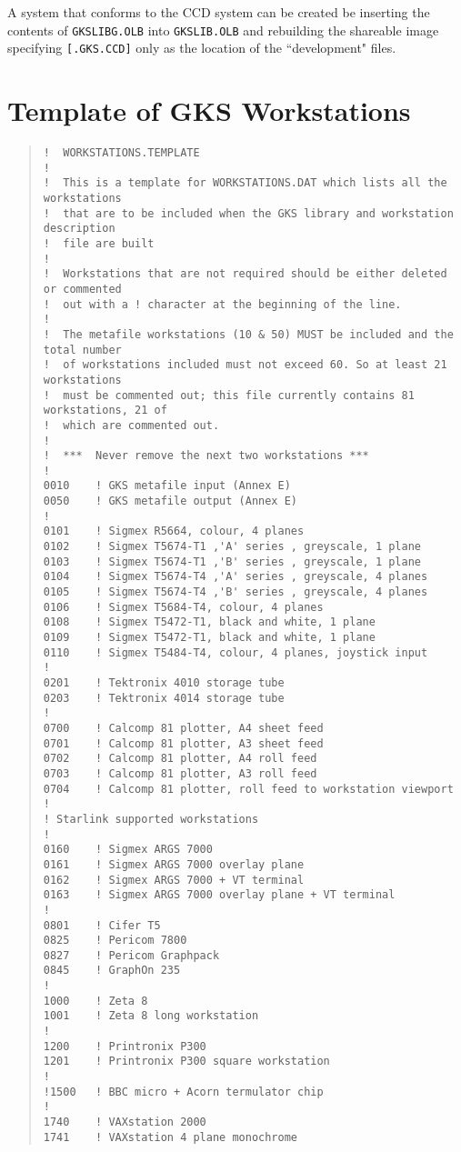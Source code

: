 A system that conforms to the CCD system can be created be inserting the
contents of {\tt GKSLIBG\-.OLB} into {\tt GKSLIB.OLB} and rebuilding the
shareable image specifying {\tt [.GKS.CCD]} only as the location of the
``development" files.

\newpage
\appendix
\section{Template of GKS Workstations}
\label{se:temp}
\begin{quote}\small
\begin{verbatim}
!  WORKSTATIONS.TEMPLATE
!
!  This is a template for WORKSTATIONS.DAT which lists all the workstations
!  that are to be included when the GKS library and workstation description
!  file are built
!
!  Workstations that are not required should be either deleted or commented
!  out with a ! character at the beginning of the line.
!
!  The metafile workstations (10 & 50) MUST be included and the total number
!  of workstations included must not exceed 60. So at least 21 workstations
!  must be commented out; this file currently contains 81 workstations, 21 of
!  which are commented out.
!
!  ***  Never remove the next two workstations ***
!
0010	! GKS metafile input (Annex E)
0050	! GKS metafile output (Annex E)
!
0101	! Sigmex R5664, colour, 4 planes
0102	! Sigmex T5674-T1 ,'A' series , greyscale, 1 plane
0103	! Sigmex T5674-T1 ,'B' series , greyscale, 1 plane
0104	! Sigmex T5674-T4 ,'A' series , greyscale, 4 planes
0105	! Sigmex T5674-T4 ,'B' series , greyscale, 4 planes
0106	! Sigmex T5684-T4, colour, 4 planes
0108	! Sigmex T5472-T1, black and white, 1 plane
0109	! Sigmex T5472-T1, black and white, 1 plane
0110	! Sigmex T5484-T4, colour, 4 planes, joystick input
!
0201	! Tektronix 4010 storage tube
0203	! Tektronix 4014 storage tube
!
0700	! Calcomp 81 plotter, A4 sheet feed
0701	! Calcomp 81 plotter, A3 sheet feed
0702	! Calcomp 81 plotter, A4 roll feed
0703	! Calcomp 81 plotter, A3 roll feed
0704	! Calcomp 81 plotter, roll feed to workstation viewport
!
! Starlink supported workstations
!
0160	! Sigmex ARGS 7000
0161	! Sigmex ARGS 7000 overlay plane
0162	! Sigmex ARGS 7000 + VT terminal
0163	! Sigmex ARGS 7000 overlay plane + VT terminal
!
0801	! Cifer T5
0825	! Pericom 7800
0827	! Pericom Graphpack
0845	! GraphOn 235
!
1000	! Zeta 8
1001	! Zeta 8 long workstation
!
1200	! Printronix P300
1201	! Printronix P300 square workstation
!
!1500	! BBC micro + Acorn termulator chip
!
1740	! VAXstation 2000
1741	! VAXstation 4 plane monochrome

\end{verbatim}
\end{quote}
